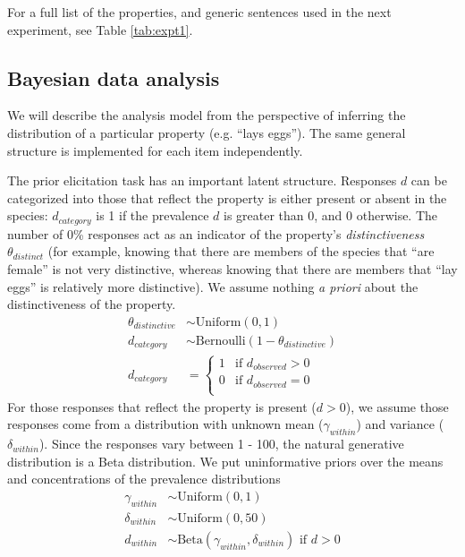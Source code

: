 \documentclass[10pt,letterpaper]{article}
\begin{document}
For a full list of the properties, and generic sentences used in the next experiment, see Table \ref{tab:expt1}.

\subsection{Bayesian data analysis}
\label{sec:bda1}

We will describe the analysis model from the perspective of inferring the distribution of a particular property (e.g. ``lays eggs''). 
The same general structure is implemented for each item independently. 

The prior elicitation task has an important latent structure. 
Responses $d$ can be categorized into those that reflect the property is either present or absent in the species: $d_{category}$ is 1 if the prevalence $d$ is greater than 0, and 0 otherwise. 
The number of 0\% responses act as an indicator of the property's \emph{distinctiveness} $\theta_{distinct}$ (for example, knowing that there are members of the species that ``are female'' is not very distinctive, whereas knowing that there are members that ``lay eggs'' is relatively more distinctive).
 We assume nothing \emph{a priori} about the distinctiveness of the property. 
%
\begin{align*}
\theta_{distinctive} & \sim \text{Uniform}(0,1) \\
d_{category} & \sim \text{Bernoulli}(1 - \theta_{distinctive}) \\
d_{category} & = \begin{cases}
				1 & \mbox{if } d_{observed} > 0 \\
				0 & \mbox{if } d_{observed} = 0 \\
				\end{cases}
\end{align*}
%
For those responses that reflect the property is present ($d > 0$), we assume those responses come from a distribution with unknown mean ($\gamma_{within}$) and variance ($\delta_{within}$). 
Since the responses vary between 1 - 100, the natural generative distribution is a Beta distribution. We put uninformative priors over the means and concentrations of the prevalence distributions
%
\begin{align*}
\gamma_{within} & \sim \text{Uniform}(0, 1) \\
\delta_{within} & \sim \text{Uniform}(0, 50) \\
d_{within} & \sim \text{Beta}(\gamma_{within}, \delta_{within})  \mbox{ if } d > 0
\end{align*}
\end{document}
